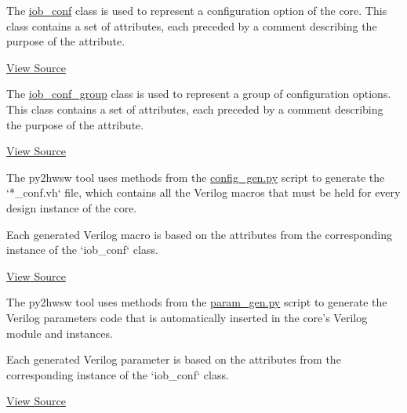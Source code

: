 %

%
%

The \href{https://github.com/IObundle/py2hwsw/blob/main/py2hwsw/scripts/iob_conf.py}{iob\_conf} class is used to represent a configuration option of the core.
This class contains a set of attributes, each preceded by a comment describing the purpose of the attribute.

\href{https://github.com/IObundle/py2hwsw/blob/main/py2hwsw/scripts/iob_conf.py}{View Source}


The \href{https://github.com/IObundle/py2hwsw/blob/main/py2hwsw/scripts/iob_conf.py}{iob\_conf\_group} class is used to represent a group of configuration options.
This class contains a set of attributes, each preceded by a comment describing the purpose of the attribute.

\href{https://github.com/IObundle/py2hwsw/blob/main/py2hwsw/scripts/iob_conf.py}{View Source}

%
%

The py2hwsw tool uses methods from the \href{https://github.com/IObundle/py2hwsw/blob/main/py2hwsw/scripts/config_gen.py}{config\_gen.py} script to generate the `*\_conf.vh` file, which contains all the Verilog macros that must be held for every design instance of the core.

Each generated Verilog macro is based on the attributes from the corresponding instance of the `iob\_conf` class.

\href{https://github.com/IObundle/py2hwsw/blob/main/py2hwsw/scripts/config_gen.py}{View Source}


The py2hwsw tool uses methods from the \href{https://github.com/IObundle/py2hwsw/blob/main/py2hwsw/scripts/param_gen.py}{param\_gen.py} script to generate the Verilog parameters code that is automatically inserted in the core's Verilog module and instances.

Each generated Verilog parameter is based on the attributes from the corresponding instance of the `iob\_conf` class.

\href{https://github.com/IObundle/py2hwsw/blob/main/py2hwsw/scripts/param_gen.py}{View Source}

